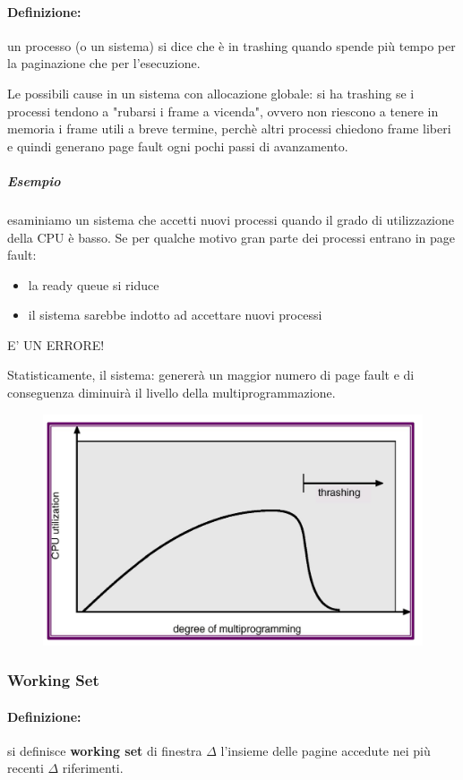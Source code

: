 \paragraph{Definizione:} un processo (o un sistema) si dice che è in trashing quando spende più tempo per la paginazione che per l'esecuzione.

Le possibili cause in un sistema con allocazione globale: si ha trashing se i processi tendono a "rubarsi i frame a vicenda",
ovvero non riescono a tenere in memoria i frame utili a breve termine, perchè altri processi chiedono frame liberi e quindi generano page fault ogni pochi passi di avanzamento.

\subparagraph{Esempio}
esaminiamo un sistema che accetti nuovi processi quando il grado di
utilizzazione della CPU è basso. Se per qualche motivo gran parte dei processi entrano in page fault:
\begin{itemize}
    \item la ready queue si riduce
    \item il sistema sarebbe indotto ad accettare nuovi processi
\end{itemize}
E' UN ERRORE!

Statisticamente, il sistema: genererà un maggior numero di page fault e di conseguenza diminuirà il livello della multiprogrammazione.

\begin{figure} [h]
    \centering
    \includegraphics[width=0.6\linewidth]{Images/Screenshot 2025-01-17 at 18-33-00 so-05-memoria - so-05-memoria.pdf.png}
\end{figure}

\subsubsection{Working Set}
\paragraph{Definizione:} si definisce \textbf{working set} di finestra $\Delta$ l'insieme delle pagine accedute nei più recenti $\Delta$ riferimenti.

